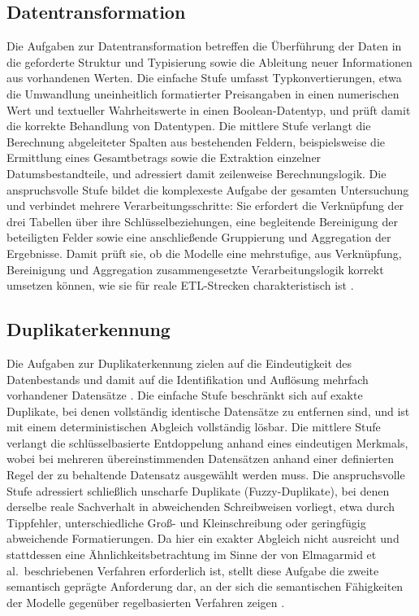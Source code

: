 \subsection{Datentransformation}
\label{subsec:aufgabe-transformation}

Die Aufgaben zur Datentransformation betreffen die Überführung der Daten in die geforderte Struktur und Typisierung sowie die Ableitung neuer Informationen aus vorhandenen Werten. Die einfache Stufe umfasst Typkonvertierungen, etwa die Umwandlung uneinheitlich formatierter Preisangaben in einen numerischen Wert und textueller Wahrheitswerte in einen Boolean-Datentyp, und prüft damit die korrekte Behandlung von Datentypen. Die mittlere Stufe verlangt die Berechnung abgeleiteter Spalten aus bestehenden Feldern, beispielsweise die Ermittlung eines Gesamtbetrags sowie die Extraktion einzelner Datumsbestandteile, und adressiert damit zeilenweise Berechnungslogik. Die anspruchsvolle Stufe bildet die komplexeste Aufgabe der gesamten Untersuchung und verbindet mehrere Verarbeitungsschritte: Sie erfordert die Verknüpfung der drei Tabellen über ihre Schlüsselbeziehungen, eine begleitende Bereinigung der beteiligten Felder sowie eine anschließende Gruppierung und Aggregation der Ergebnisse. Damit prüft sie, ob die Modelle eine mehrstufige, aus Verknüpfung, Bereinigung und Aggregation zusammengesetzte Verarbeitungslogik korrekt umsetzen können, wie sie für reale \ac{ETL}-Strecken charakteristisch ist \autocite{khanOverviewETLTechniques2024,walhaDataIntegrationTraditional2024}.

\subsection{Duplikaterkennung}
\label{subsec:aufgabe-duplikate}

Die Aufgaben zur Duplikaterkennung zielen auf die Eindeutigkeit des Datenbestands und damit auf die Identifikation und Auflösung mehrfach vorhandener Datensätze \autocite{elmagarmidDuplicateRecordDetection2007,coteDataCleaningMachine2024}. Die einfache Stufe beschränkt sich auf exakte Duplikate, bei denen vollständig identische Datensätze zu entfernen sind, und ist mit einem deterministischen Abgleich vollständig lösbar. Die mittlere Stufe verlangt die schlüsselbasierte Entdoppelung anhand eines eindeutigen Merkmals, wobei bei mehreren übereinstimmenden Datensätzen anhand einer definierten Regel der zu behaltende Datensatz ausgewählt werden muss. Die anspruchsvolle Stufe adressiert schließlich unscharfe Duplikate (Fuzzy-Duplikate), bei denen derselbe reale Sachverhalt in abweichenden Schreibweisen vorliegt, etwa durch Tippfehler, unterschiedliche Groß- und Kleinschreibung oder geringfügig abweichende Formatierungen. Da hier ein exakter Abgleich nicht ausreicht und stattdessen eine Ähnlichkeitsbetrachtung im Sinne der von Elmagarmid et al.\ beschriebenen Verfahren erforderlich ist, stellt diese Aufgabe die zweite semantisch geprägte Anforderung dar, an der sich die semantischen Fähigkeiten der Modelle gegenüber regelbasierten Verfahren zeigen \autocite{elmagarmidDuplicateRecordDetection2007,hassaniRoleChatGPTData2023}.

